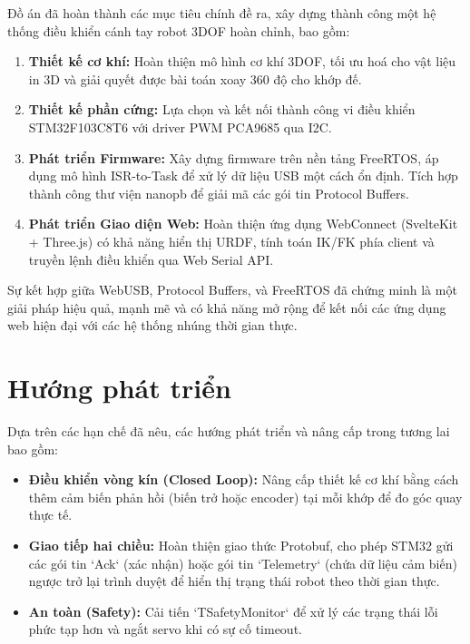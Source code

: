 \documentclass[12pt, a4paper, oneside]{report}
\numberwithin{equation}{chapter} %
\numberwithin{figure}{chapter}   %
\numberwithin{table}{chapter}    %
\begin{document}
Đồ án đã hoàn thành các mục tiêu chính đề ra, xây dựng thành công một hệ thống điều khiển cánh tay robot 3DOF hoàn chỉnh, bao gồm:
\begin{enumerate}
    \item \textbf{Thiết kế cơ khí:} Hoàn thiện mô hình cơ khí 3DOF, tối ưu hoá cho vật liệu in 3D và giải quyết được bài toán xoay 360 độ cho khớp đế.
    \item \textbf{Thiết kế phần cứng:} Lựa chọn và kết nối thành công vi điều khiển STM32F103C8T6 với driver PWM PCA9685 qua I2C.
    \item \textbf{Phát triển Firmware:} Xây dựng firmware trên nền tảng FreeRTOS, áp dụng mô hình ISR-to-Task để xử lý dữ liệu USB một cách ổn định. Tích hợp thành công thư viện nanopb để giải mã các gói tin Protocol Buffers.
    \item \textbf{Phát triển Giao diện Web:} Hoàn thiện ứng dụng WebConnect (SvelteKit + Three.js) có khả năng hiển thị URDF, tính toán IK/FK phía client và truyền lệnh điều khiển qua Web Serial API.
\end{enumerate}

Sự kết hợp giữa WebUSB, Protocol Buffers, và FreeRTOS đã chứng minh là một giải pháp hiệu quả, mạnh mẽ và có khả năng mở rộng để kết nối các ứng dụng web hiện đại với các hệ thống nhúng thời gian thực.

\section{Hướng phát triển}

Dựa trên các hạn chế đã nêu, các hướng phát triển và nâng cấp trong tương lai bao gồm:
\begin{itemize}
    \item \textbf{Điều khiển vòng kín (Closed Loop):} Nâng cấp thiết kế cơ khí bằng cách thêm cảm biến phản hồi (biến trở hoặc encoder) tại mỗi khớp để đo góc quay thực tế.
    \item \textbf{Giao tiếp hai chiều:} Hoàn thiện giao thức Protobuf, cho phép STM32 gửi các gói tin `Ack` (xác nhận) hoặc gói tin `Telemetry` (chứa dữ liệu cảm biến) ngược trở lại trình duyệt để hiển thị trạng thái robot theo thời gian thực.
    \item \textbf{An toàn (Safety):} Cải tiến `TSafetyMonitor` để xử lý các trạng thái lỗi phức tạp hơn và ngắt servo khi có sự cố timeout.
\end{itemize}
\end{document}
